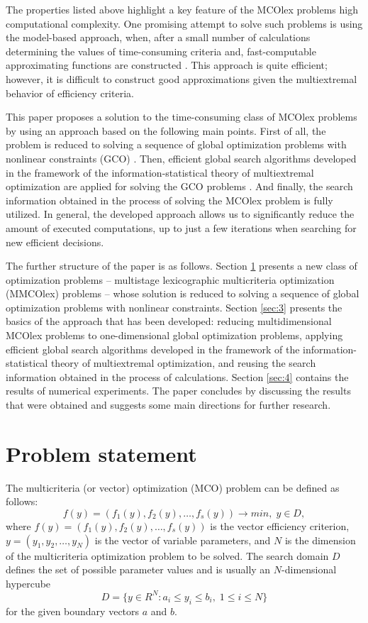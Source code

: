 \documentclass[smallextended]{svjour3}       %
\begin{document}
The properties listed above highlight a key feature of the MCOlex problems   high computational complexity. One promising attempt to solve such problems is using the model-based approach, when, after a small number of calculations determining the values of time-consuming criteria and, fast-computable approximating functions are constructed \cite{c15,c16}. This approach is quite efficient; however, it is difficult to construct good approximations given the multiextremal behavior of efficiency criteria.

This paper proposes a solution to the time-consuming class of MCOlex problems by using an approach based on the following main points. First of all, the problem is reduced to solving a sequence of global optimization problems with nonlinear constraints (GCO) \cite{c2,c14}. Then, efficient global search algorithms developed in the framework of the information-statistical theory of multiextremal optimization are applied for solving the GCO problems \cite{c17,c18}. And finally, the search information obtained in the process of solving the MCOlex problem is fully utilized. In general, the developed approach allows us to significantly reduce the amount of executed computations, up to just a few iterations when searching for new efficient decisions.

The further structure of the paper is as follows. Section \ref{sec:2} presents a new class of optimization problems -- multistage lexicographic multicriteria optimization (MMCOlex) problems -- whose solution is reduced to solving a sequence of global optimization problems with nonlinear constraints. Section \ref{sec:3} presents the basics of the approach that has been developed: reducing multidimensional MCOlex problems to one-dimensional global optimization problems, applying efficient global search algorithms developed in the framework of the information-statistical theory of multiextremal optimization, and reusing the search information obtained in the process of calculations. Section \ref{sec:4} contains the results of numerical experiments. The paper concludes by discussing the results that were obtained and suggests some main directions for further research.

\section{Problem statement}
\label{sec:2}

The multicriteria (or vector) optimization (MCO) problem can be defined as follows:
\begin{equation}\label{eq:1}
f(y) = (f_1(y), f_2(y), \dots , f_s(y)) \to min, \; y \in D,
\end{equation}
where $f(y) = (f_1(y), f_2(y), \dots , f_s(y))$ is the vector efficiency criterion, $y = (y_1, y_2, \dots , y_N)$ is the vector of variable parameters, and $N$ is the dimension of the multicriteria optimization problem to be solved. The search domain $D$ defines the set of possible parameter values and is usually an $N$-dimensional hypercube
\begin{equation}\label{eq:2}
D  = \{ y\in R^N: a_i \leq y_i \leq b_i, \; 1 \leq i \leq N \}
\end{equation}
for the given boundary vectors $a$ and $b$.
\end{document}

